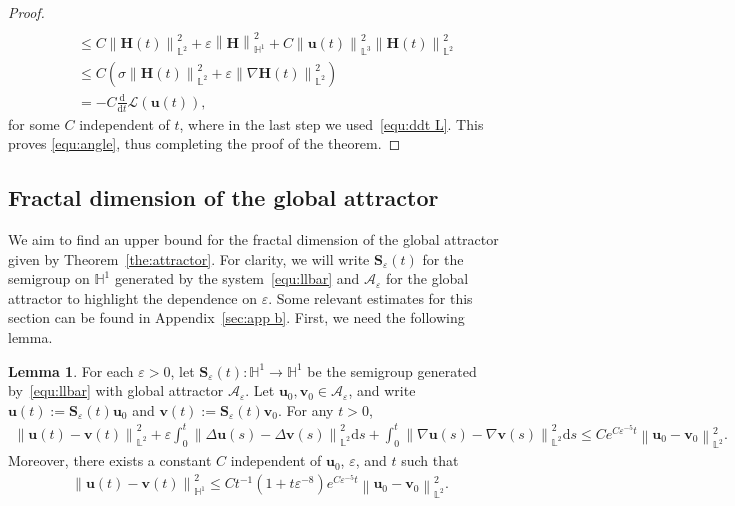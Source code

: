\documentclass[11pt, reqno]{amsart}
\theoremstyle{definition}
\newtheorem{lemma}[theorem]{Lemma}
\numberwithin{equation}{section}
\newcommand{\bff}{\boldsymbol}
\newcommand{\bb}{\mathbb}
\newcommand{\ddt}{\frac{\mathrm{d}}{\mathrm{d}t}}
\newcommand{\ds}{\mathrm{d}s}
\newcommand{\bl}[1]{{\color{blue}{#1}}}
\newcommand{\norm}[2]{\left\|{#1}\right\|_{#2}}
\newcommand{\inpro}[2]{\left\langle#1,#2\right\rangle}
\begin{document}
\begin{proof}
\begin{align*}
	\\
	&\leq
	C \norm{\bff{H}(t)}{\bb{L}^2}^2
	+
	\varepsilon \norm{\bff{H}}{\bb{H}^1}^2
	+
	C \norm{\bff{u}(t)}{\bb{L}^3}^2 \norm{\bff{H}(t)}{\bb{L}^2}^2
	\\
	&\leq
	C \left( \sigma \norm{\bff{H}(t)}{\bb{L}^2}^2 + \varepsilon \norm{\nabla \bff{H}(t)}{\bb{L}^2}^2 \right)
    \\
    &=
    -C\ddt \mathcal{L}(\bff{u}(t)),
\end{align*}
for some $C$ independent of $t$, where in the last step we used~\eqref{equ:ddt L}.
This proves \eqref{equ:angle}, thus completing the proof of the theorem.
\end{proof}


\subsection{Fractal dimension of the global attractor}\label{sec:frac dim}
We aim to find an upper bound for the fractal dimension of the global attractor given by Theorem~\ref{the:attractor}. For clarity, we will write $\bff{S}_\varepsilon(t)$ for the semigroup on $\bb{H}^1$ generated by the system~\eqref{equ:llbar} and $\mathcal{A}_\varepsilon$ for the global attractor to highlight the dependence on $\varepsilon$. Some relevant estimates for this section can be found in Appendix~\ref{sec:app b}.
First, we need the following lemma.

\begin{lemma}\label{lem:pre dim f}
For each $\varepsilon>0$, let $\bff{S}_\varepsilon(t):\bb{H}^1\to \bb{H}^1$ be the semigroup generated by~\eqref{equ:llbar} with global attractor $\mathcal{A}_\varepsilon$. Let $\bff{u}_0, \bff{v}_0 \in \mathcal{A}_\varepsilon$, and write $\bff{u}(t):= \bff{S}_\varepsilon(t)\bff{u}_0$ and $\bff{v}(t):= \bff{S}_\varepsilon(t) \bff{v}_0$. For any $t>0$,
\begin{align}\label{equ:A L2uv}
    \norm{\bff{u}(t)- \bff{v}(t)}{\bb{L}^2}^2
    +
    \varepsilon \int_0^t \norm{\Delta \bff{u}(s)-\Delta \bff{v}(s)}{\bb{L}^2}^2 \ds
    +
    \int_0^t \norm{\nabla \bff{u}(s)-\nabla \bff{v}(s)}{\bb{L}^2}^2 \ds 
    \leq
    C e^{C\varepsilon^{-5} t} \norm{\bff{u}_0-\bff{v}_0}{\bb{L}^2}^2.
\end{align}
Moreover, there exists a constant $C$ independent of $\bff{u}_0$, $\varepsilon$, and $t$ such that
\begin{align}\label{equ:A H1 uv}
    \norm{\bff{u}(t)- \bff{v}(t)}{\bb{H}^1}^2
    \leq
    Ct^{-1} \left(1+t\varepsilon^{-8}\right)e^{C\varepsilon^{-5} t} \norm{\bff{u}_0-\bff{v}_0}{\bb{L}^2}^2.
\end{align}
\end{lemma}
\end{document}
